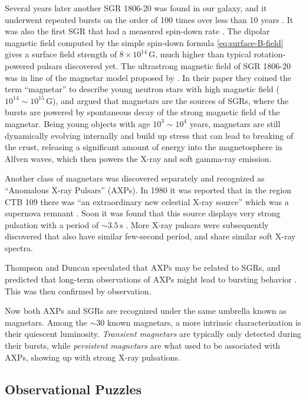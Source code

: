 Several years later another SGR 1806-20 was found in our galaxy, and it
underwent repeated bursts on the order of 100 times over less than 10 years
\citep{kouveliotou_smm_1987,laros_new_1987}. It was also the first SGR that had
a measured spin-down rate \citep{kouveliotou_x-ray_1998}. The dipolar magnetic
field computed by the simple spin-down formula \eqref{eq:surface-B-field} gives
a surface field strength of $8\times 10^{14}\,\mathrm{G}$, much higher than
typical rotation-powered pulsars discovered yet. The ultrastrong magnetic field
of SGR 1806-20 was in line of the magnetar model proposed by
\citet{duncan_formation_1992}. In their paper they coined the term ``magnetar''
to describe young neutron stars with high magnetic field ($10^{14}\sim
10^{15}\,\mathrm{G}$), and argued that magnetars are the sources of SGRs, where
the bursts are powered by spontaneous decay of the strong magnetic field of the
magnetar. Being young objects with age $10^{3}\sim 10^{4}$ years, magnetars are
still dynamically evolving internally and build up stress that can lead to
breaking of the crust, releasing a significant amount of energy into the
magnetosphere in Alfven waves, which then powers the X-ray and soft gamma-ray
emission.

Another class of magnetars was discovered separately and recognized as
``Anomalous X-ray Pulsars'' (AXPs). In 1980 it was reported that in the
region CTB 109 there was ``an extraordinary new celestial X-ray
source'' which was a supernova remnant \citep{gregory_extraordinary_1980}. Soon
it was found that this source displays very strong pulsation with a period of
$\sim 3.5\,\mathrm{s}$ \citep{fahlman_x-ray_1981}. More X-ray pulsars were
subsequently discovered that also have similar few-second period, and share
similar soft X-ray spectra.

Thompson and Duncan speculated that AXPs may be related to SGRs, and predicted
that long-term observations of AXPs might lead to bursting behavior
\citet{thompson_soft_1996}. This was then confirmed by
observation. %

Now both AXPs and SGRs are recognized under the same umbrella known as
magnetars. Among the $\sim 30$ known magnetars, a more intrinsic
characterization is their quiescent luminosity. {\it Transient magnetars} are
typically only detected during their bursts, while {\it persistent magnetars}
are what used to be associated with AXPs, showing up with strong X-ray
pulsations.

\subsection{Observational Puzzles}
\label{sec:magnetar-puzzles}

